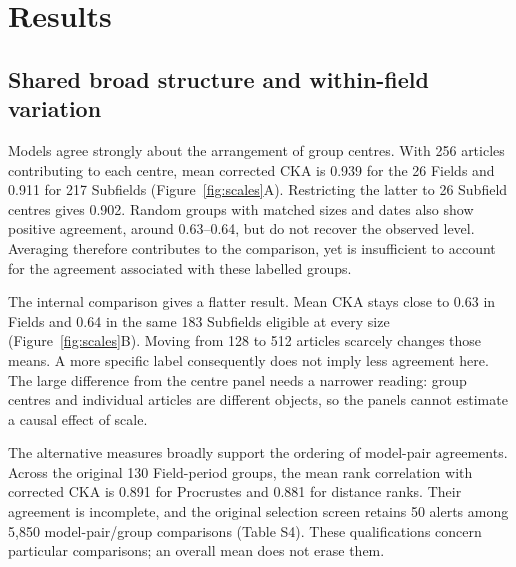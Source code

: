 \documentclass[12pt]{article}
\begin{document}
\section{Results}
\subsection{Shared broad structure and within-field variation}
Models agree strongly about the arrangement of group centres. With 256 articles contributing to each centre, mean corrected CKA is 0.939 for the 26 Fields and 0.911 for 217 Subfields (Figure~\ref{fig:scales}A). Restricting the latter to 26 Subfield centres gives 0.902. Random groups with matched sizes and dates also show positive agreement, around 0.63--0.64, but do not recover the observed level. Averaging therefore contributes to the comparison, yet is insufficient to account for the agreement associated with these labelled groups.

The internal comparison gives a flatter result. Mean CKA stays close to 0.63 in Fields and 0.64 in the same 183 Subfields eligible at every size (Figure~\ref{fig:scales}B). Moving from 128 to 512 articles scarcely changes those means. A more specific label consequently does not imply less agreement here. The large difference from the centre panel needs a narrower reading: group centres and individual articles are different objects, so the panels cannot estimate a causal effect of scale.

The alternative measures broadly support the ordering of model-pair agreements. Across the original 130 Field-period groups, the mean rank correlation with corrected CKA is 0.891 for Procrustes and 0.881 for distance ranks. Their agreement is incomplete, and the original selection screen retains 50 alerts among 5,850 model-pair/group comparisons (Table S4). These qualifications concern particular comparisons; an overall mean does not erase them.
\end{document}
